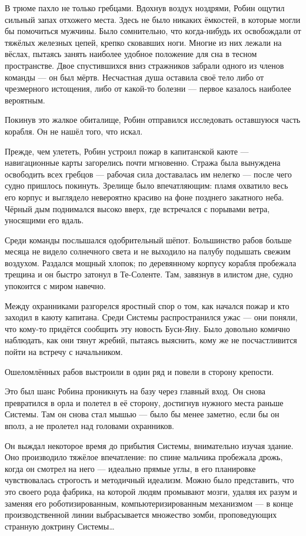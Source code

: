 \documentclass[a5paper, 9pt,
final, openany, twoside=true]{memoir}
\begin{document}
В трюме пахло не только гребцами. Вдохнув воздух ноздрями, Робин ощутил сильный запах отхожего места. Здесь не было никаких ёмкостей, в которые могли бы помочиться мужчины. Было сомнительно, что когда-нибудь их освобождали от тяжёлых железных цепей, крепко сковавших ноги. Многие из них лежали на вёслах, пытаясь занять наиболее удобное положение для сна в тесном пространстве. Двое спустившихся вниз стражников забрали одного из членов команды — он был мёртв. Несчастная душа оставила своё тело либо от чрезмерного истощения, либо от какой-то болезни — первое казалось наиболее вероятным.\bigskip

Покинув это жалкое обиталище, Робин отправился исследовать оставшуюся часть корабля. Он не нашёл того, что искал.

Прежде, чем улететь, Робин устроил пожар в капитанской каюте — навигационные карты загорелись почти мгновенно. Стража была вынуждена освободить всех гребцов — рабочая сила доставалась им нелегко — после чего судно пришлось покинуть. Зрелище было впечатляющим: пламя охватило весь его корпус и выглядело невероятно красиво на фоне позднего закатного неба. Чёрный дым поднимался высоко вверх, где встречался с порывами ветра, уносящими его вдаль.

Среди команды послышался одобрительный шёпот. Большинство рабов больше месяца не видело солнечного света и не выходило на палубу подышать свежим воздухом. Раздался мощный хлопок; по деревянному корпусу корабля пробежала трещина и он быстро затонул в Те-Соленте. Там, завязнув в илистом дне, судно упокоится с миром навечно.

Между охранниками разгорелся яростный спор о том, как начался пожар и кто заходил в каюту капитана. Среди Системы распространился ужас — они поняли, что кому-то придётся сообщить эту новость Буси-Яну. Было довольно комично наблюдать, как они тянут жребий, пытаясь выяснить, кому же не посчастливится пойти на встречу с начальником.

Ошеломлённых рабов выстроили в один ряд и повели в сторону крепости.

Это был шанс Робина проникнуть на базу через главный вход. Он снова превратился в орла и полетел в её сторону, достигнув нужного места раньше Системы. Там он снова стал мышью — было бы менее заметно, если бы он вполз, а не пролетел над головами охранников.

Он выждал некоторое время до прибытия Системы, внимательно изучая здание. Оно производило тяжёлое впечатление: по спине мальчика пробежала дрожь, когда он смотрел на него — идеально прямые углы, в его планировке чувствовалась строгость и методичный идеализм. Можно было представить, что это своего рода фабрика, на которой людям промывают мозги, удаляя их разум и заменяя его роботизированным, компьютеризированным механизмом — в конце производственной линии выбрасывается множество зомби, проповедующих странную доктрину Системы…\bigskip
\end{document}
